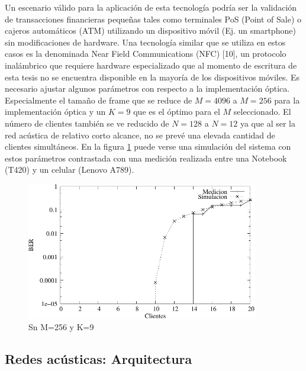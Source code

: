 Un escenario válido para la aplicación de esta tecnología podría ser la validación de transacciones financieras pequeñas tales como terminales PoS (Point of Sale) o cajeros automáticos (ATM) utilizando un dispositivo móvil (Ej. un smartphone) sin modificaciones de hardware. Una tecnología similar que se utiliza en estos casos es la denominada Near Field Communications (NFC) [10], un protocolo inalámbrico que requiere hardware especializado que al momento de escritura de esta tesis no se encuentra disponible en la mayoría de los dispositivos móviles.
Es necesario ajustar algunos parámetros con respecto a la implementación óptica. Especialmente el tamaño de frame que se reduce de $M=4096$ a $M=256$ para la implementación óptica y un $K=9$ que es el óptimo para el $M$ seleccionado. El número de clientes también se ve reducido de $N=128$ a $N=12$ ya que al ser la red acústica de relativo corto alcance, no se prevé una elevada cantidad de clientes simultáneos. En la figura \ref{arch:AudioSimul} puede verse una simulación del sistema con estos parámetros contrastada con una medición realizada entre una Notebook (T420) y un celular (Lenovo A789).

\begin{figure}[t]
  \centering
    \includegraphics[width=4in]{graphs/audio-fig6}
    \caption{Sn M=256 y K=9}
    \label{arch:AudioSimul}
\end{figure}



\subsection{Redes acústicas: Arquitectura}

